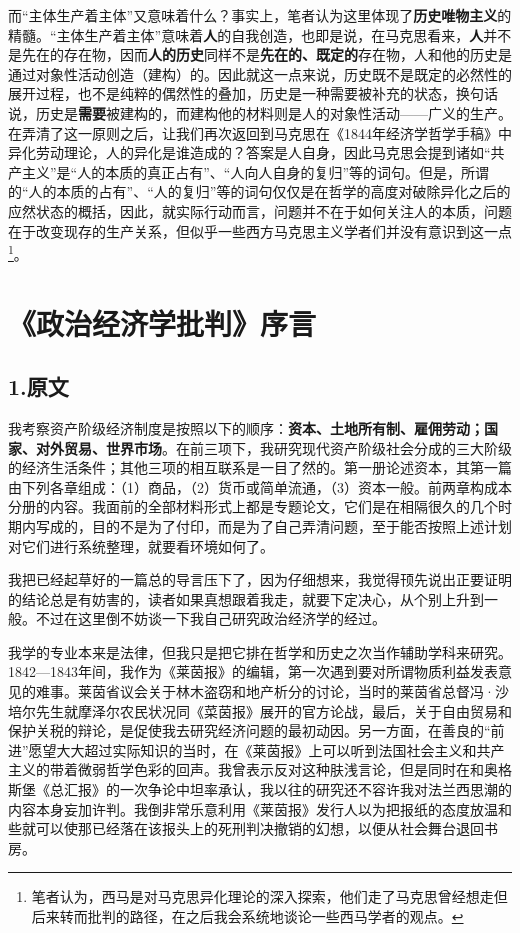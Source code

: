 \documentclass[a4paper,twoside,12pt,AutoFakeBold]{ctexart}
\begin{document}
而“主体生产着主体”又意味着什么？事实上，笔者认为这里体现了\textbf{历史唯物主义}的精髓。“主体生产着主体”意味着\textbf{人}的自我创造，也即是说，在马克思看来，\textbf{人}并不是先在的存在物，因而\textbf{人的历史}同样不是\textbf{先在的、既定的}存在物，人和他的历史是通过对象性活动创造（建构）的。因此就这一点来说，历史既不是既定的必然性的展开过程，也不是纯粹的偶然性的叠加，历史是一种需要被补充的状态，换句话说，历史是\textbf{需要}被建构的，而建构他的材料则是人的对象性活动——广义的生产。在弄清了这一原则之后，让我们再次返回到马克思在《1844年经济学哲学手稿》中异化劳动理论，人的异化是谁造成的？答案是人自身，因此马克思会提到诸如“共产主义”是“人的本质的真正占有”、“人向人自身的复归”等的词句。但是，所谓的“人的本质的占有”、“人的复归”等的词句仅仅是在哲学的高度对破除异化之后的应然状态的概括，因此，就实际行动而言，问题并不在于如何关注人的本质，问题在于改变现存的生产关系，但似乎一些西方马克思主义学者们并没有意识到这一点\footnote{笔者认为，西马是对马克思异化理论的深入探索，他们走了马克思曾经想走但后来转而批判的路径，在之后我会系统地谈论一些西马学者的观点。}。

\newpage

\section{《政治经济学批判》序言}
\subsection{1.原文}
我考察资产阶级经济制度是按照以下的顺序：\textbf{资本、土地所有制、雇佣劳动；国家、对外贸易、世界市场}。在前三项下，我研究现代资产阶级社会分成的三大阶级的经济生活条件；其他三项的相互联系是一目了然的。第一册论述资本，其第一篇由下列各章组成：（1）商品，（2）货币或简单流通，（3）资本一般。前两章构成本分册的内容。我面前的全部材料形式上都是专题论文，它们是在相隔很久的几个时期内写成的，目的不是为了付印，而是为了自己弄清问题，至于能否按照上述计划对它们进行系统整理，就要看环境如何了。

我把已经起草好的一篇总的导言压下了，因为仔细想来，我觉得顸先说出正要证明的结论总是有妨害的，读者如果真想跟着我走，就要下定决心，从个别上升到一般。不过在这里倒不妨谈一下我自己研究政治经济学的经过。

我学的专业本来是法律，但我只是把它排在哲学和历史之次当作辅助学科来研究。1842—1843年间，我作为《莱茵报》的编辑，第一次遇到要对所谓物质利益发表意见的难事。莱茵省议会关于林木盗窃和地产析分的讨论，当时的莱茵省总督冯·沙培尔先生就摩泽尔农民状况同《菜茵报》展开的官方论战，最后，关于自由贸易和保护关税的辩论，是促使我去研究经济问题的最初动因。另一方面，在善良的“前进”愿望大大超过实际知识的当时，在《莱茵报》上可以听到法国社会主义和共产主义的带着微弱哲学色彩的回声。我曾表示反对这种肤浅言论，但是同时在和奥格斯堡《总汇报》的一次争论中坦率承认，我以往的研究还不容许我对法兰西思潮的内容本身妄加许判。我倒非常乐意利用《莱茵报》发行人以为把报纸的态度放温和些就可以使那已经落在该报头上的死刑判决撤销的幻想，以便从社会舞台退回书房。
\end{document}
